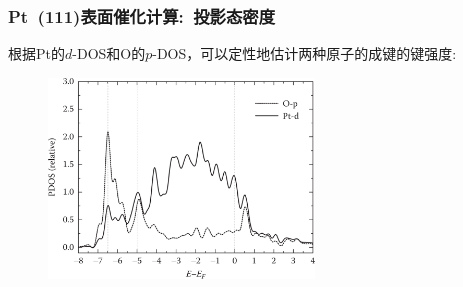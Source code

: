 \frame
{
	\frametitle{\textrm{Pt~(111)}表面催化计算:~投影态密度}

	根据\textrm{Pt}的$d$-\textrm{DOS}和\textrm{O}的$p$-DOS，可以定性地估计两种原子的成键的键强度:~\\
\begin{figure}[h!]
\centering
\includegraphics[height=2.1in,viewport=0 0 820 620,clip]{Figures/Pt_surface_PDOS.png}
\caption{\fontsize{6.2pt}{5.2pt}}%
\label{Pt_surface_PDOS}
\end{figure}
}

